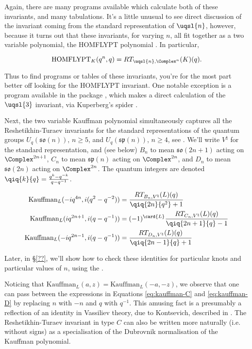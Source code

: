 Again, there are many programs available which calculate both of these
invariants, and many tabulations. It's a little unusual to see direct
discussion of the invariant coming from the standard representation of
$\uqsl{n}$, however, because it turns out that these invariants, for
varying $n$, all fit together as a two variable polynomial, the HOMFLYPT
polynomial \cite{MR776477}. In particular,

$$\text{HOMFLYPT}_K(q^n, q) = RT_{\uqsl{n}, \Complex^n}(K)(q).$$

Thus to find programs or tables of these invariants, you're for the most
part better off looking for the HOMFLYPT invariant. One notable exception
is a program available in the  \MMA package \cite{???},
which makes a direct calculation of the $\uqsl{3}$ invariant, via
Kuperberg's spider \cite{???}.

Next, the two variable Kauffman polynomial \cite{MR958895} simultaneously
captures all the Reshetikhin-Turaev invariants for the standard
representations of the quantum groups $U_q(\mathfrak{so}(n))$, $n \geq
5$, and $U_q(\mathfrak{sp}(n))$, $n \geq 4$, see \cite{MR939474, MR1090432}.
We'll write $V^\natural$ for the standard representation, and (see below)
$B_n$ to mean $\mathfrak{so}(2n+1)$ acting on $\Complex^{2n+1}$, $C_n$ to
mean $\mathfrak{sp}(n)$ acting on $\Complex^{2n}$, and $D_n$ to mean
$\mathfrak{so}(2n)$ acting on $\Complex^{2n}$. The quantum integers are
denoted $\qiq{k}{q} = \frac{q^k-q^{-k}}{q-q^{-1}}$.

\begin{align}
\label{eq:kauffman-B}%
\text{Kauffman}_L(-i q^{4n}, i (q^2-q^{-2})) & = \frac{RT_{B_n, V^\natural}(L)(q)}{\qiq{2n}{q^2} + 1} \\
\label{eq:kauffman-C}%
\text{Kauffman}_L(i q^{2n+1}, i (q-q^{-1})) & = (-1)^{\card{L}} \frac{RT_{C_n, V^\natural}(L)(q)}{\qiq{2n+1}{q} - 1} \\
\label{eq:kauffman-D}%
\text{Kauffman}_L(-i q^{2n-1}, i (q-q^{-1})) & = \frac{RT_{D_n, V^\natural}(L)(q)}{\qiq{2n-1}{q} + 1}
\end{align}

Later, in \S \ref{??}, we'll show how to check these identities for particular knots and particular values of $n$, using the \pkg. \todo{}

Noticing that $\text{Kauffman}_L(a,z) = \text{Kauffman}_L(-a,-z)$, we
observe that one can pass between the expressions in Equations
\ref{eq:kauffman-C} and \ref{eq:kauffman-D} by replacing $n$ with $-n$
and $q$ with $q^{-1}$. This amusing fact is a presumably a reflection of
an identity in Vassiliev theory, due to Kontsevich, described in
\cite[Exercise 6.37]{MR1318886}. The Reshetikhin-Turaev invariant in type $C$ can also be written more naturally (i.e. without signs)
as a specialisation of the Dubrovnik normalisation \cite{MR966143,MR980759} of the Kauffman polynomial.


